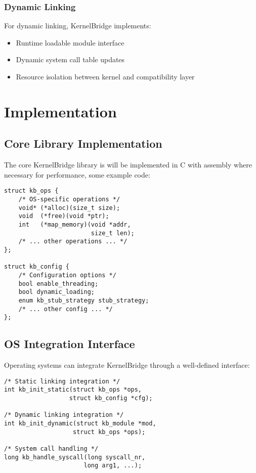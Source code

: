 \documentclass[conference]{IEEEtran}
\begin{document}
\subsubsection{Dynamic Linking}
For dynamic linking, KernelBridge implements:
\begin{itemize}
	\item Runtime loadable module interface
	\item Dynamic system call table updates
	\item Resource isolation between kernel and compatibility layer
\end{itemize}

\section{Implementation}
\subsection{Core Library Implementation}
The core KernelBridge library is will be implemented in C with assembly where necessary for
performance, some example code:

\begin{verbatim}
struct kb_ops {
    /* OS-specific operations */
    void* (*alloc)(size_t size);
    void  (*free)(void *ptr);
    int   (*map_memory)(void *addr, 
						size_t len);
    /* ... other operations ... */
};

struct kb_config {
    /* Configuration options */
    bool enable_threading;
    bool dynamic_loading;
    enum kb_stub_strategy stub_strategy;
    /* ... other config ... */
};
\end{verbatim}

\subsection{OS Integration Interface}
Operating systems can integrate KernelBridge through a well-defined interface:

\begin{verbatim}
/* Static linking integration */
int kb_init_static(struct kb_ops *ops, 
                  struct kb_config *cfg);

/* Dynamic linking integration */
int kb_init_dynamic(struct kb_module *mod,
                   struct kb_ops *ops);

/* System call handling */
long kb_handle_syscall(long syscall_nr,
                      long arg1, ...);
\end{verbatim}
\end{document}
